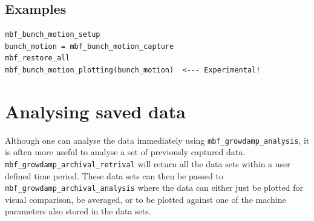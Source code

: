 \documentclass{report}
\begin{document}
\section{Examples}

\begin{verbatim}
mbf_bunch_motion_setup
bunch_motion = mbf_bunch_motion_capture
mbf_restore_all
mbf_bunch_motion_plotting(bunch_motion)  <--- Experimental!
\end{verbatim}

\chapter{Analysing saved data}
Although one can analyse the data immediately using \verb|mbf_growdamp_analysis|, it is often more useful to analyse a set of previously captured data. \verb|mbf_growdamp_archival_retrival| will return all the data sets within a user defined time period. These data sets can then be passed to \verb|mbf_growdamp_archival_analysis| where the data can either just be plotted for visual comparison, be averaged, or to be plotted against one of the machine parameters also stored in the data sets.
\end{document}
